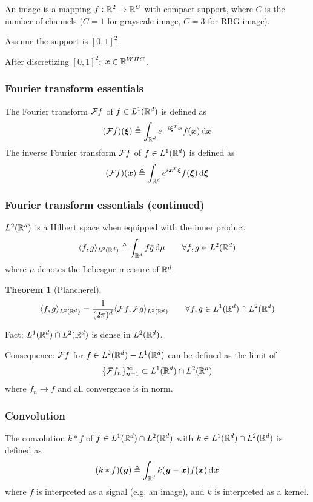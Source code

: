\documentclass{article}
\newtheorem{theorem}{Theorem}
\begin{document}
An image is a mapping $f: {\mathbb R}^2 \rightarrow {\mathbb R}^C$ with compact support, where $C$ is the number of channels ($C = 1$ for grayscale image, $C = 3$ for RBG image).

Assume the support is $[0, 1]^2$.

After discretizing $[0, 1]^2$: ${\bm x} \in {\mathbb R}^{W H C}$.

\subsubsection{Fourier transform essentials}

\begin{definition}
The Fourier transform ${\mathcal F} f$ of $f \in L^1 ({\mathbb R}^d)$ is defined as
\[
(\calf f) (\bmxi) \triangleq \int_{\bbr^d} e^{-i \bmxi^T \bmx} f(\bmx) \dif \bmx
\]
The inverse Fourier transform ${\mathcal F} f$ of $f \in L^1 ({\mathbb R}^d)$ is defined as
\[
(\calf f) (\bmx) \triangleq \int_{\bbr^d} e^{i \bmx^T \bmxi} f(\bmxi) \dif \bmxi
\]
\end{definition}

\subsubsection{Fourier transform essentials (continued)}

$L^2 ({\mathbb R}^d)$ is a Hilbert space when equipped with the inner product
\[
\langle f, g\rangle_{L^2 (\bbr^d)} \triangleq \int_{\bbr^d} f \bar{g} \dif \mu \qquad \forall f, g \in L^2 (\bbr^d)
\]
where $\mu$ denotes the Lebesgue measure of ${\mathbb R}^d$.

\begin{theorem}[Plancherel]
\[
\langle f, g\rangle_{L^2 ({\mathbb R}^d)} = \frac1{(2 \pi)^d} \langle {\mathcal F} f, {\mathcal F} g\rangle_{L^2 ({\mathbb R}^d)} \qquad \forall f, g \in L^1 ({\mathbb R}^d) \cap L^2 ({\mathbb R}^d)
\]
\end{theorem}

Fact: $L^1 ({\mathbb R}^d) \cap L^2 ({\mathbb R}^d)$ is dense in $L^2 ({\mathbb R}^d)$.

Consequence: ${\mathcal F} f$ for $f \in L^2 ({\mathbb R}^d) - L^1 ({\mathbb R}^d)$ can be defined as the limit of
\[
\{{\mathcal F} f_n\}_{n = 1}^\infty \subset L^1 ({\mathbb R}^d) \cap L^2 ({\mathbb R}^d)
\]
where $f_n \rightarrow f$ and all convergence is in norm.

\subsubsection{Convolution}

The convolution $k * f$ of $f \in L^1 ({\mathbb R}^d) \cap L^2 ({\mathbb R}^d)$ with $k \in L^1 ({\mathbb R}^d) \cap L^2 ({\mathbb R}^d)$ is defined as
\[
(k * f) (\bmy) \triangleq \int_{\bbr^d} k(\bmy - \bmx) f(\bmx) \dif \bmx
\]
where $f$ is interpreted as a signal (e.g. an image), and $k$ is interpreted as a kernel.
\end{document}
